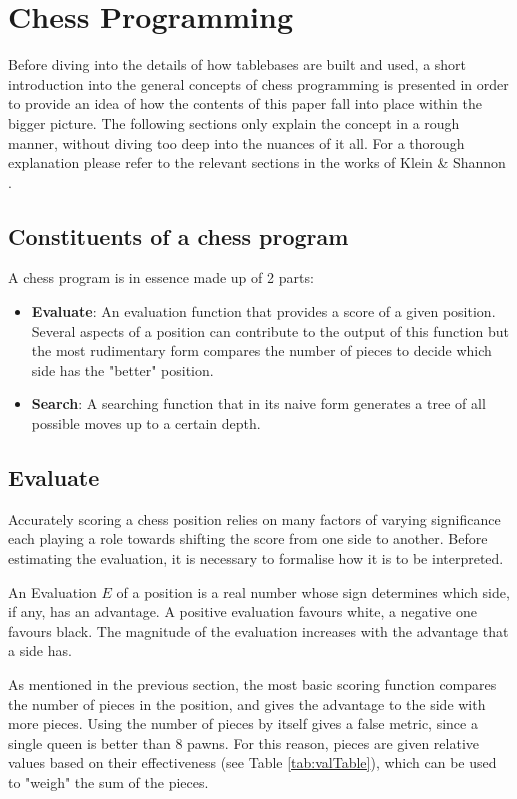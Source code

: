 \section{Chess Programming}
\label{sec:Chess Programming}

Before diving into the details of how tablebases are built and used, a short introduction into the general concepts of chess programming is presented in order to provide an idea of how the contents of this paper fall into place within the bigger picture. The following sections only explain the concept in a rough manner, without diving too deep into the nuances of it all. For a thorough explanation please refer to the relevant sections in the works of Klein \cite{Klein} \& Shannon \cite{Shan50}.

\newpage

\subsection{Constituents of a chess program}
A chess program is in essence made up of 2 parts:

\begin{itemize}
    \item \textbf{Evaluate}: An evaluation function that provides a score of a given position. Several aspects of a position can contribute to the output of this function but the most rudimentary form compares the number of pieces to decide which side has the "better" position.
    \item \textbf{Search}: A searching function that in its naive form generates a tree of all possible moves up to a certain depth.
\end{itemize}

\subsection{Evaluate}
Accurately scoring a chess position relies on many factors of varying significance each playing a role towards shifting the score from one side to another. Before estimating the evaluation, it is necessary to formalise how it is to be interpreted. 

An Evaluation \(E\) of a position is a real number whose sign determines which side, if any, has an advantage. A positive evaluation favours white, a negative one favours black. The magnitude of the evaluation increases with the advantage that a side has.

As mentioned in the previous section, the most basic scoring function compares the number of pieces in the position, and gives the advantage to the side with more pieces. Using the number of pieces by itself gives a false metric, since a single queen is better than 8 pawns. For this reason, pieces are given relative values based on their effectiveness (see Table \ref{tab:valTable}), which can be used to "weigh" the sum of the pieces.

